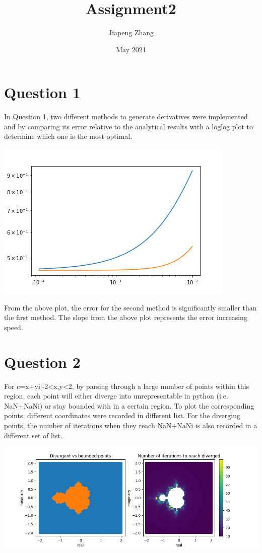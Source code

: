 \documentclass{article}
\title{Assignment2}
\author{Jiapeng Zhang}
\date{May 2021}
\begin{document}
\maketitle

\section{Question 1}
In Question 1, two different methods to generate derivatives were implemented and by comparing its error relative to the analytical results with a loglog plot to determine which one is the most optimal.

\includegraphics[scale=0.8]{Question_1.png}

From the above plot, the error for the second method is significantly smaller than the first method. The slope from the above plot represents the error increasing speed.

\section{Question 2}
For {c=x+yi|-2<x,y<2}, by parsing through a large number of points within this region, each point will either diverge into unrepresentable in python (i.e. NaN+NaNi) or stay bounded with in a certain region. To plot the corresponding points, different coordinates were recorded in different list. For the diverging points, the number of iterations when they reach NaN+NaNi is also recorded in a different set of list.

\includegraphics[scale=0.5]{Question_2.png}
\end{document}
